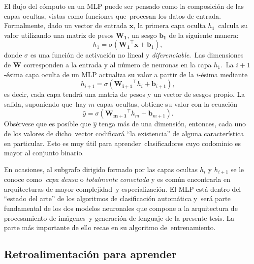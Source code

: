 El flujo del cómputo en un MLP puede ser pensado como la composición de las capas ocultas, vistas como funciones que\
procesan los datos de entrada. Formalmente, dado un vector de entrada $\mathbf{x}$, la primera capa oculta $h_1$\
calcula su valor utilizando una matriz de pesos $\mathbf{W_1}$, un sesgo $\mathbf{b_1}$ de la siguiente manera:
\begin{equation}
  h_1 = \sigma\left(\mathbf{W_1}^\top \mathbf{x} + \mathbf{b}_1\right), \label{mlpfirst}
\end{equation}
donde $\sigma$ es una función de activación no lineal y \emph{diferenciable}.\
Las dimensiones de $\mathbf{W}$ corresponden a la entrada y al número de neuronas en la capa $h_1$.\
La $i+1$-ésima capa oculta de un MLP actualiza su valor a partir de la $i$-ésima mediante
\begin{equation}
  h_{i+1} = \sigma\left(\mathbf{W_{i+1}}^\top h_i + \mathbf{b}_{i+1}\right), \label{mlphidden}
\end{equation}
es decir, cada capa tendrá una matriz de pesos y un vector de sesgos propio. La salida, suponiendo que\
hay $m$ capas ocultas, obtiene su valor con la ecuación
\begin{equation}
  \hat{y} = \sigma\left(\mathbf{W_{m+1}}^\top h_m + \mathbf{b}_{m+1}\right). \label{mlpoutput}
\end{equation}
Obsérvese que es posible que $\hat{y}$ tenga más de una dimensión, entonces, cada uno de los valores de dicho\
vector codificará ``la existencia'' de alguna característica en particular. Esto es muy útil para aprender\
clasificadores cuyo codominio es mayor al conjunto binario.\par
En ocasiones, al subgrafo dirigido formado por las capas ocultas $h_i$ y $h_{i+1}$ se le conoce como\
\emph{capa densa} o \emph{totalmente conectada} y es común encontrarla en arquitecturas de mayor complejidad\
y especialización. El MLP está dentro del ``estado del arte'' de los algoritmos de clasificación automática y\
será parte fundamental de los dos modelos neuronales que compone a la arquitectura de procesamiento de imágenes\
y generación de lenguaje de la presente tesis. La parte más importante de ello recae en su algoritmo de\
entrenamiento.

\subsection{Retroalimentación para aprender}

